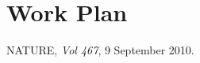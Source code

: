\documentclass[11pt, titlepage, oneside]{article}
\theoremstyle{plain}
\theoremstyle{definition}
\theoremstyle{remark}
\begin{document}
\section{Work Plan}




\begin{thebibliography}{1}
		NATURE,
		\emph{Vol 467},
		9 September 2010.
		

\end{thebibliography}	

\end{document}
